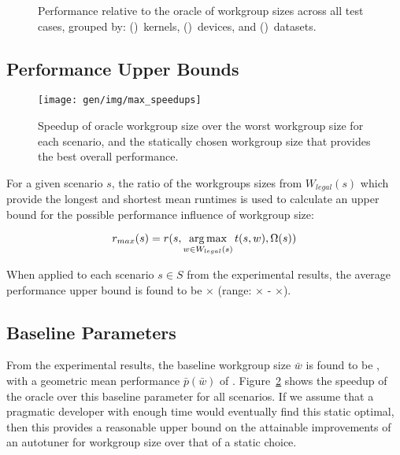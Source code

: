 \begin{figure}

\caption{%
  Performance relative to the oracle of workgroup sizes across all
  test cases, grouped by: ()~kernels,
  ()~devices, and
  ()~datasets.%
}
\label{fig:performances}
\end{figure}


\subsection{Performance Upper Bounds}

\begin{figure}
\texttt{[image: gen/img/max\_speedups]}
\caption{%
  Speedup of oracle workgroup size over the worst workgroup size for
  each scenario, and the statically chosen workgroup size that
  provides the best overall performance.%
}
\label{fig:speedups}
\end{figure}

For a given scenario $s$, the ratio of the workgroups sizes from
$W_{legal}(s)$ which provide the longest and shortest mean runtimes is
used to calculate an upper bound for the possible performance
influence of workgroup size:

\begin{equation}
r_{max}(s) = r(s, \operatorname*{arg\,max}_{w \in W_{legal}(s)} t(s,w), \Omega(s))
\end{equation}

When applied to each scenario $s \in S$ from the experimental results,
the average performance upper bound is found to be
$\times$ (range:
$\times$ -
$\times$).



\subsection{Baseline Parameters}

From the experimental results, the baseline workgroup size $\bar{w}$
is found to be , with a geometric mean performance
$\bar{p}(\bar{w})$ of
. Figure~\ref{fig:speedups} shows the speedup of
the oracle over this baseline parameter for all scenarios. If we
assume that a pragmatic developer with enough time would eventually
find this static optimal, then this provides a reasonable upper bound
on the attainable improvements of an autotuner for workgroup size over
that of a static choice.


